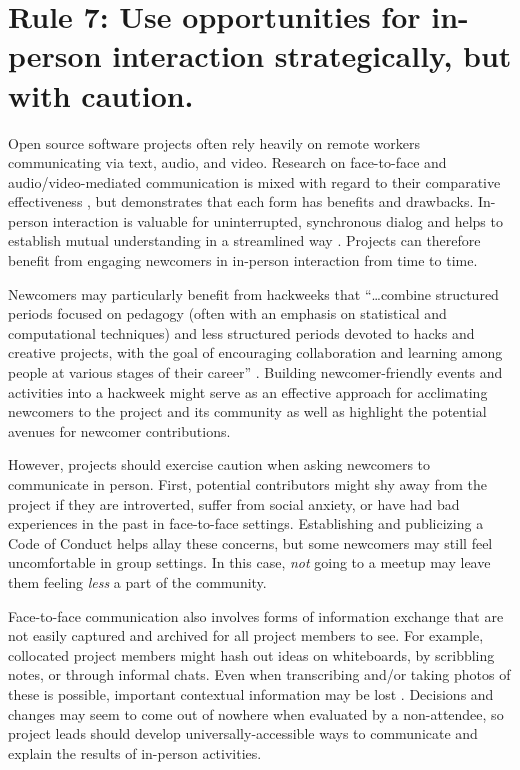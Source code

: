 \documentclass[10pt,letterpaper]{article}
\newcommand{\rulemajor}[1]{\section{#1}}
\begin{document}
\rulemajor{Rule 7: Use opportunities for in-person interaction strategically, but with caution.}

Open source software projects often rely heavily on remote workers communicating via text, audio, and video.
Research on face-to-face and audio/video-mediated communication is mixed
with regard to their comparative effectiveness \cite{doherty1997,gallupe1990,nardi2002},
but demonstrates that each form has benefits and drawbacks.
In-person interaction is valuable for uninterrupted, synchronous dialog
and helps to establish mutual understanding in a streamlined way \cite{omalley1996}.
Projects can therefore benefit from engaging newcomers in in-person interaction from time to time.

Newcomers may particularly benefit from hackweeks that ``{\ldots}combine structured periods focused on pedagogy
(often with an emphasis on statistical and computational techniques)
and less structured periods devoted to hacks and creative projects,
with the goal of encouraging collaboration and learning among people at various stages of their career'' \cite{huppenkothen2018}.
Building newcomer-friendly events and activities into a hackweek
might serve as an effective approach for acclimating newcomers to the project and its community
as well as highlight the potential avenues for newcomer contributions.

However,
projects should exercise caution when asking newcomers to communicate in person.
First, potential contributors might shy away from the project if they are introverted,
suffer from social anxiety,
or have had bad experiences in the past in face-to-face settings.
Establishing and publicizing a Code of Conduct helps allay these concerns,
but some newcomers may still feel uncomfortable in group settings.
In this case,
\emph{not} going to a meetup may leave them feeling \emph{less} a part of the community.

Face-to-face communication also involves forms of information exchange
that are not easily captured and archived for all project members to see.
For example,
collocated project members might hash out ideas on whiteboards,
by scribbling notes,
or through informal chats.
Even when transcribing and/or taking photos of these is possible,
important contextual information may be lost \cite{cherubini2007}.
Decisions and changes may seem to come out of nowhere when evaluated by a non-attendee,
so project leads should develop universally-accessible ways to communicate and explain the results of in-person activities.
\end{document}
